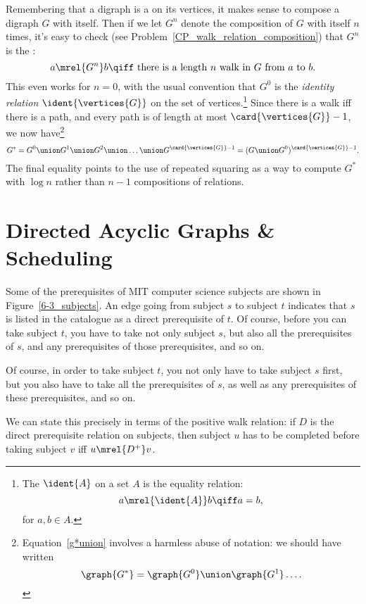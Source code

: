 Remembering that a digraph is a  on its vertices, it
makes sense to compose a digraph $G$ with itself.  Then if we let
$G^n$ denote the composition of $G$ with itself $n$ times, it's easy
to check (see Problem~\ref{CP_walk_relation_composition}) that $G^n$
is the :
\[
a  \mrel{G^n} b \qiff \mbox{ there is a length $n$ walk in $G$ from $a$ to $b$}.
\]
This even works for $n=0$, with the usual convention that $G^0$ is the
\emph{identity relation} $\ident{\vertices{G}}$ on the set of
vertices.\footnote{The  $\ident{A}$ on a set $A$
  is the equality relation:
\[
a \mrel{\ident{A}} b \qiff a  = b,
\]
for $a,b \in A$.}  Since there is a walk iff there is a path,
and every path is of length at most $\card{\vertices{G}}-1$, 
we now have\footnote{Equation~\eqref{g*union} involves a harmless
  abuse of notation: we should have written
\[
\graph{G^*} = \graph{G^0} \union \graph{G^1} \dots.
\]
}
\begin{equation}\label{g*union}
G^* = G^0 \union G^1 \union G^2 \union \dots \union
G^{\card{\vertices{G}}-1} = (G \union G^0)^{\card{\vertices{G}}-1}.
\end{equation}
The final equality points to the use of repeated squaring as a way to
compute $G^*$ with $\log n$ rather than $n-1$ compositions of
relations.

\begin{problems}
\practiceproblems
{}

\homeworkproblems
{}  %

\end{problems}

\section{Directed Acyclic Graphs \& Scheduling}\label{dag_sec}

Some of the prerequisites of MIT computer science subjects are shown
in Figure~\ref{6-3_subjects}.  An edge going from subject $s$ to
subject $t$ indicates that $s$ is listed in the catalogue as a direct
prerequisite of $t$.  Of course, before you can take subject $t$, you
have to take not only subject $s$, but also all the prerequisites of $s$,
and any prerequisites of those prerequisites, and so on.
\begin{editingnotes} Of course, in order to take subject $t$, you
  not only have to take subject $s$ first, but you also have to take
  all the prerequisites of $s$, as well as any prerequisites of these
  prerequisites, and so on.
\end{editingnotes}
We can state this precisely in terms of the positive walk relation: if
$D$ is the direct prerequisite relation on subjects, then subject $u$
has to be completed before taking subject $v$ iff $u \mrel{D^+} v$.

